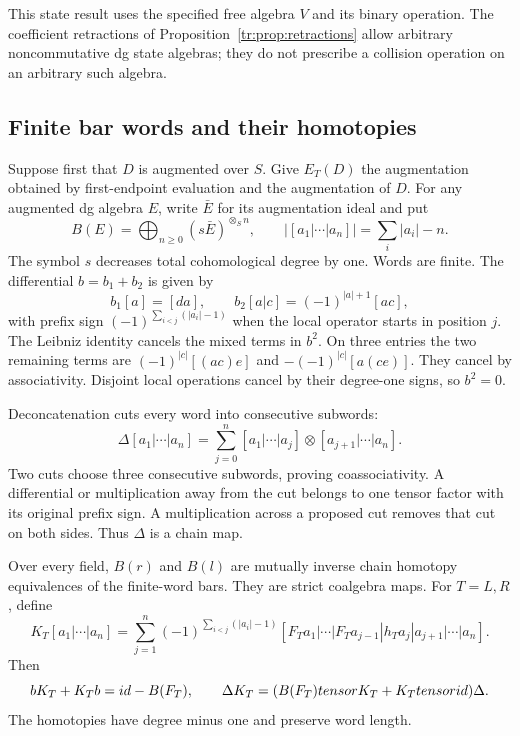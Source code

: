 This state result uses the specified free algebra \(V\) and its
binary operation.  The coefficient retractions of
Proposition~\ref{tr:prop:retractions} allow arbitrary noncommutative
dg state algebras; they do not prescribe a collision operation on
an arbitrary such algebra.

\subsection{Finite bar words and their homotopies}

Suppose first that \(D\) is augmented over \(S\).  Give
\(E_T(D)\) the augmentation obtained by first-endpoint evaluation
and the augmentation of \(D\).  For any augmented dg algebra
\(E\), write \(\bar E\) for its augmentation ideal and put
\[
 B(E)=\bigoplus_{n\ge0}(s\bar E)^{\otimes_S n},
 \qquad |[a_1|\cdots|a_n]|=\sum_i|a_i|-n.
\]
The symbol \(s\) decreases total cohomological degree by one.
Words are finite.  The differential \(b=b_1+b_2\) is given by
\[
 b_1[a]=[da],\qquad b_2[a|c]=(-1)^{|a|+1}[ac],
\]
with prefix sign \((-1)^{\sum_{i<j}(|a_i|-1)}\) when
the local operator starts in position \(j\).
The Leibniz identity cancels the mixed terms in \(b^2\).
On three entries the two remaining terms are
\((-1)^{|c|}[(ac)e]\) and \(-(-1)^{|c|}[a(ce)]\).
They cancel by associativity.  Disjoint local operations cancel by
their degree-one signs, so \(b^2=0\).

Deconcatenation cuts every word into consecutive subwords:
\[
 \Delta[a_1|\cdots|a_n]
 =\sum_{j=0}^n[a_1|\cdots|a_j]\otimes[a_{j+1}|\cdots|a_n].
\]
Two cuts choose three consecutive subwords, proving coassociativity.
A differential or multiplication away from the cut belongs to one
tensor factor with its original prefix sign.  A multiplication across
a proposed cut removes that cut on both sides.  Thus \(\Delta\)
is a chain map.

\begin{theorem}
\label{tr:thm:bar-rotation}
Over every field, \(B(r)\) and \(B(l)\) are mutually inverse
chain homotopy equivalences of the finite-word bars.  They are strict
coalgebra maps.  For \(T=L,R\), define
\begin{equation}\label{tr:eq:bar-homotopy}
 K_T[a_1|\cdots|a_n]
 =\sum_{j=1}^n(-1)^{\sum_{i<j}(|a_i|-1)}
 [F_Ta_1|\cdots|F_Ta_{j-1}|h_Ta_j|a_{j+1}|\cdots|a_n].
\end{equation}
Then
\[
 bK_T+K_Tb=id-B(F_T),\qquad
 \Delta K_T=(B(F_T)tensor K_T+K_Ttensorid)\Delta.
\]
The homotopies have degree minus one and preserve word length.
\end{theorem}

